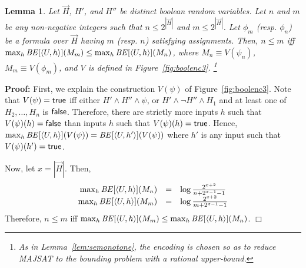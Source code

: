 \documentclass{llncs}
\newtheorem{lemma}[theorem]{Lemma}
\newenvironment{proof}{\noindent\rm{\bf Proof:}}{\hbox{$\Box$}\vspace*{0.2\baselineskip}}
\newcommand{\aseq}[1]{\langle#1\rangle}
\newcommand{\vect}[1]{\overrightarrow{{#1}}}
\begin{document}
\begin{lemma}
\label{lem:be2mono}
Let $\vect H$, $H'$, and $H''$ be distinct boolean random variables.
Let $n$ and $m$ be any non-negative integers such that $n\le
2^{|{\vect H}|}$ and $m\le 2^{|\vect{H}|}$.  Let $\phi_m$ (resp.
$\phi_n$) be a formula over $\vect H$ having $m$ (resp. $n$)
satisfying assignments. Then, $n\le m$ iff $\max_h {\it
  BE}[\aseq{U,h}](M_m)\le \max_h {\it BE}[\aseq{U,h}](M_n)$, where
$M_n\equiv V(\psi_n)$, $M_m\equiv V(\phi_m)$, and $V$ is defined in
Figure~\ref{fig:boolenc3}.
\footnote{As in Lemma~\ref{lem:semonotone}, the encoding is
    chosen so as to reduce MAJSAT to the bounding problem with a
    rational upper-bound.}
\end{lemma}
\begin{proof}
First, we explain the construction $V(\psi)$ of
Figure~\ref{fig:boolenc3}.  Note that $V(\psi) = {\sf true}$ iff
either $H'\wedge H'' \wedge \psi$, or $H' \wedge \neg H'' \wedge H_1$
and at least one of $H_2,\dots,H_n$ is ${\sf false}$.  Therefore,
there are strictly more inputs $h$ such that $V(\psi)(h) = {\sf
  false}$ than inputs $h$ such that $V(\psi)(h) = {\sf true}$.  Hence,
$\max_h {\it BE}[\aseq{U,h}](V(\psi)) = {\it
  BE}[\aseq{U,h'}](V(\psi))$ where $h'$ is any input such that
$V(\psi)(h') = {\sf true}$.

Now, let $x=|\vect H|$.  Then,
\[
\begin{array}{rcl}
  \max_h {\it BE}[\aseq{U,h}](M_n)&=&\log\frac{2^{x+2}}{n + 2^{x-1}-1}\\
  \max_h {\it BE}[\aseq{U,h}](M_m)&=&\log\frac{2^{x+2}}{m + 2^{x-1}-1}\\
\end{array}
\]
Therefore, $n \leq m$ iff $\max_h {\it BE}[\aseq{U,h}](M_m) \leq \max_h {\it BE}[\aseq{U,h}](M_n)$.
\end{proof}
\end{document}
